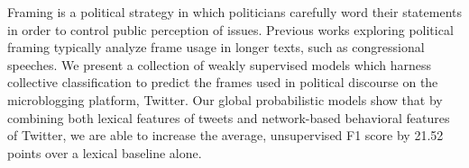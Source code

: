 Framing is a political strategy in which politicians carefully word their statements in order to control public perception of issues. Previous works exploring political framing typically analyze frame usage in longer texts, such as congressional speeches. We present a collection of weakly supervised models which harness collective classification to predict the frames used in political discourse on the microblogging platform, Twitter. Our global probabilistic models show that by combining both lexical features of tweets and network-based behavioral features of Twitter, we are able to increase the average, unsupervised F1 score by 21.52 points over a lexical baseline alone.

